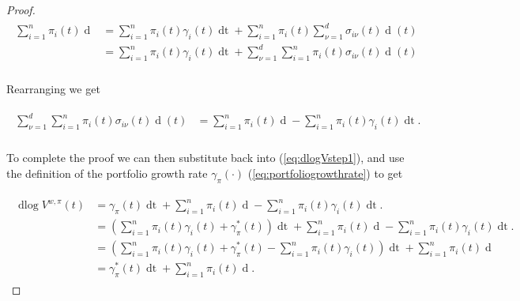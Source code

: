 \documentclass[british]{amsart} \usepackage{lmodern}
\numberwithin{equation}{section} \numberwithin{figure}{section}
\theoremstyle{plain} \newtheorem{thm}{\protect\theoremname}[section]
\theoremstyle{definition} \newtheorem{defn}[thm]{\protect\definitionname}
\theoremstyle{plain} \newtheorem{assumption}[thm]{\protect\assumptionname}
\theoremstyle{plain} \newtheorem{lem}[thm]{\protect\lemmaname}
\theoremstyle{plain} \newtheorem{prop}[thm]{\protect\propositionname}
\theoremstyle{remark} \newtheorem{rem}[thm]{\protect\remarkname}
\theoremstyle{plain} \newtheorem{cor}[thm]{\protect\corollaryname}
\renewcommand{\d}[1]{\mathop{\mathrm{d}{#1}}}
\newcommand{\V}{V^{w,\pi}}
\begin{document}
\begin{proof}
  \begin{gather*}
    \begin{split}
       \sum_{i=1}^{n} \pi_{i}(t) \d{\log{X_{i}(t)}} 
        &=
          \sum_{i=1}^{n} \pi_{i}(t) \gamma_{i}(t) \d{t} +
          \sum_{i=1}^{n} \pi_{i}(t) \sum_{\nu=1}^{d} \sigma_{i\nu}(t) \d{W_{\nu}}(t) \\
        &=
          \sum_{i=1}^{n} \pi_{i}(t) \gamma_{i}(t) \d{t} +
          \sum_{\nu=1}^{d} \sum_{i=1}^{n} \pi_{i}(t) \sigma_{i\nu}(t) \d{W_{\nu}}(t) \\
    \end{split}
  \end{gather*}

  Rearranging we get 

  \begin{gather*}
    \begin{split}
       \sum_{\nu=1}^{d} \sum_{i=1}^{n} 
            \pi_{i}(t) \sigma_{i\nu}(t) \d{W_{\nu}}(t) &=
       \sum_{i=1}^{n} \pi_{i}(t) \d{\log{X_{i}(t)}} -
       \sum_{i=1}^{n} \pi_{i}(t) \gamma_{i}(t) \d{t}. \\
    \end{split}
  \end{gather*}

  To complete the proof we can then substitute back into (\ref{eq:dlogVstep1}),
  and use the  definition of the portfolio growth rate $\gamma_{\pi}(\cdot)$
  (\ref{eq:portfoliogrowthrate}) to get 

  \begin{gather}
    \begin{split}
      \d\log{\V(t)} 
      &=
        \gamma_{\pi}(t) \d{t} +
        \sum_{i=1}^{n} \pi_{i}(t) \d{\log{X_{i}(t)}} -
        \sum_{i=1}^{n} \pi_{i}(t) \gamma_{i}(t) \d{t}. \\
      &=
        \left( 
            \sum_{i=1}^{n} \pi_{i}(t)\gamma_{i}(t) + \gamma_{\pi}^{*}(t) 
        \right) \d{t} +
        \sum_{i=1}^{n} \pi_{i}(t) \d{\log{X_{i}(t)}} -
        \sum_{i=1}^{n} \pi_{i}(t) \gamma_{i}(t) \d{t}. \\
       &=
        \left( 
            \sum_{i=1}^{n} \pi_{i}(t)\gamma_{i}(t) 
            + \gamma_{\pi}^{*}(t) 
            - \sum_{i=1}^{n} \pi_{i}(t) \gamma_{i}(t)
        \right) \d{t} +
        \sum_{i=1}^{n} \pi_{i}(t) \d{\log{X_{i}(t)}} \\
       &=
        \gamma_{\pi}^{*}(t)\d{t} +
        \sum_{i=1}^{n} \pi_{i}(t) \d{\log{X_{i}(t)}}.
    \end{split}
  \end{gather}

\end{proof}
\end{document}
